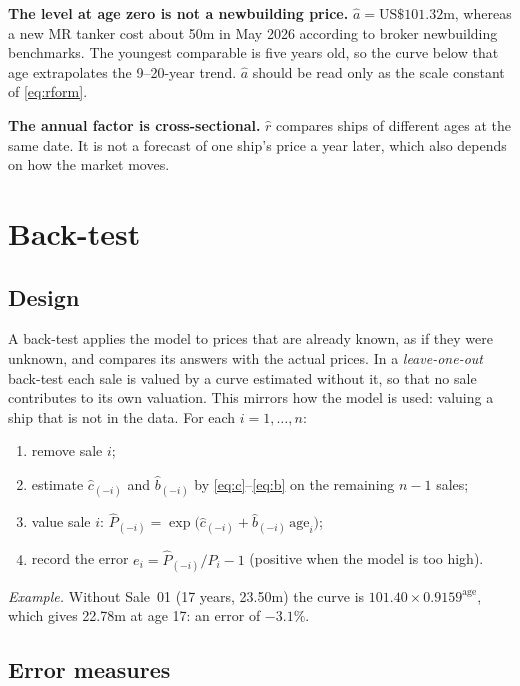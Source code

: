 \documentclass[11pt,a4paper]{article}
\newcommand{\usd}[1]{\text{US\$}#1}
\newcommand{\age}{\mathrm{age}}
\begin{document}
\textbf{The level at age zero is not a newbuilding price.} $\hat a = \usd{101.32}$m, whereas a new MR tanker cost about \usd{50}m in May 2026 according to broker newbuilding benchmarks. The youngest comparable is five years old, so the curve below that age extrapolates the 9--20-year trend. $\hat a$ should be read only as the scale constant of \eqref{eq:rform}.

\textbf{The annual factor is cross-sectional.} $\hat r$ compares ships of different ages at the same date. It is not a forecast of one ship's price a year later, which also depends on how the market moves.

\section{Back-test}

\subsection{Design}

A back-test applies the model to prices that are already known, as if they were unknown, and compares its answers with the actual prices.
In a \emph{leave-one-out} back-test each sale is valued by a curve estimated without it, so that no sale contributes to its own valuation. This mirrors how the model is used: valuing a ship that is not in the data. For each $i = 1, \dots, n$:
\begin{enumerate}
\item remove sale $i$;
\item estimate $\hat c_{(-i)}$ and $\hat b_{(-i)}$ by \eqref{eq:c}--\eqref{eq:b} on the remaining $n-1$ sales;
\item value sale $i$: $\hat P_{(-i)} = \exp\bigl(\hat c_{(-i)} + \hat b_{(-i)}\,\age_i\bigr)$;
\item record the error $e_i = \hat P_{(-i)}/P_i - 1$ (positive when the model is too high).
\end{enumerate}

\emph{Example.} Without Sale~01 (17 years, \usd{23.50}m) the curve is $101.40 \times 0.9159^{\age}$, which gives \usd{22.78}m at age 17: an error of $-3.1\%$.

\subsection{Error measures}
\end{document}
